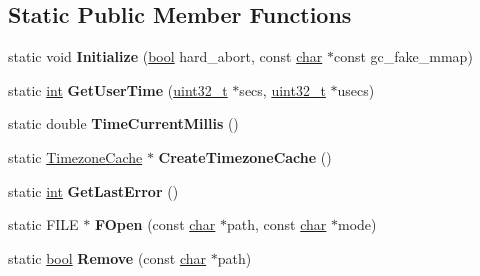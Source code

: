\subsection*{Static Public Member Functions}
\begin{DoxyCompactItemize}
\item 
\mbox{\label{classv8_1_1base_1_1OS_a439c1176d441a94b4d6d1b6c8db3b53a}} 
static void {\bfseries Initialize} (\mbox{\hyperlink{classbool}{bool}} hard\+\_\+abort, const \mbox{\hyperlink{classchar}{char}} $\ast$const gc\+\_\+fake\+\_\+mmap)
\item 
\mbox{\label{classv8_1_1base_1_1OS_ab14abe0c27358916e32d1d5552ac182f}} 
static \mbox{\hyperlink{classint}{int}} {\bfseries Get\+User\+Time} (\mbox{\hyperlink{classuint32__t}{uint32\+\_\+t}} $\ast$secs, \mbox{\hyperlink{classuint32__t}{uint32\+\_\+t}} $\ast$usecs)
\item 
\mbox{\label{classv8_1_1base_1_1OS_ad95b9514ae4123f8d0a5456d6f2cc204}} 
static double {\bfseries Time\+Current\+Millis} ()
\item 
\mbox{\label{classv8_1_1base_1_1OS_ad481e6ce21d8194ec47b14e59e8aadaf}} 
static \mbox{\hyperlink{classv8_1_1base_1_1TimezoneCache}{Timezone\+Cache}} $\ast$ {\bfseries Create\+Timezone\+Cache} ()
\item 
\mbox{\label{classv8_1_1base_1_1OS_a6dc6ca7fa1417c3b8ae2d70fb19ab023}} 
static \mbox{\hyperlink{classint}{int}} {\bfseries Get\+Last\+Error} ()
\item 
\mbox{\label{classv8_1_1base_1_1OS_a847804239d3654d9dc61325fd7a8b195}} 
static F\+I\+LE $\ast$ {\bfseries F\+Open} (const \mbox{\hyperlink{classchar}{char}} $\ast$path, const \mbox{\hyperlink{classchar}{char}} $\ast$mode)
\item 
\mbox{\label{classv8_1_1base_1_1OS_afc81cb4b82d6a51170eb77b2ac4cbd97}} 
static \mbox{\hyperlink{classbool}{bool}} {\bfseries Remove} (const \mbox{\hyperlink{classchar}{char}} $\ast$path)
\item 
\mbox{\label{classv8_1_1base_1_1OS_aa010f31048d7a2baf7f30973bc5854d0}} 

\end{DoxyCompactItemize}

